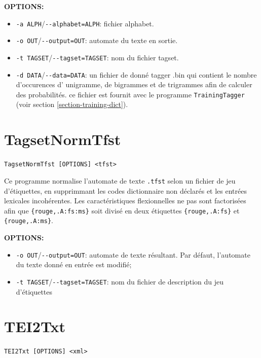 \bigskip
\noindent \textbf{OPTIONS:}
\begin{itemize}
\item \verb+-a ALPH+/\verb+--alphabet=ALPH+: fichier alphabet.
\item \verb+-o OUT+/\verb+--output=OUT+: automate du texte en sortie.
  \item \verb+-t TAGSET+/\verb+--tagset=TAGSET+: nom du fichier tagset.
  \item \verb+-d DATA+/\verb+--data=DATA+: un fichier de donné tagger .bin  qui contient le nombre d'occurences d' 
  	  unigramme, de bigrammes et de  trigrammes afin de calculer des probabilités. ce fichier est fournit avec 
  	  le programme \verb+TrainingTagger+ (voir section \ref{section-training-dict}).
\end{itemize}





\section{TagsetNormTfst}
 \verb+TagsetNormTfst [OPTIONS] <tfst>+

\bigskip
\noindent Ce programme normalise l’automate de texte \verb+.tfst+ selon
un fichier de jeu d'étiquettes, en supprimmant les codes dictionnaire non déclarés
et les entrées lexicales incohérentes. Les caractéristiques flexionnelles ne pas sont factorisées
afin que \verb+{rouge,.A:fs:ms}+ soit divisé en deux étiquettes \verb+{rouge,.A:fs}+ 
et \verb+{rouge,.A:ms}+.

\bigskip
\noindent \textbf{OPTIONS:}
\begin{itemize}
\item \verb+-o OUT+/\verb+--output=OUT+: automate de texte résultant. Par défaut, l'automate du texte donné en entrée est modifié;
\item \verb+-t TAGSET+/\verb+--tagset=TAGSET+: nom du fichier de description du jeu d'étiquettes
\end{itemize}







\section{TEI2Txt} 
\verb+TEI2Txt [OPTIONS] <xml>+

